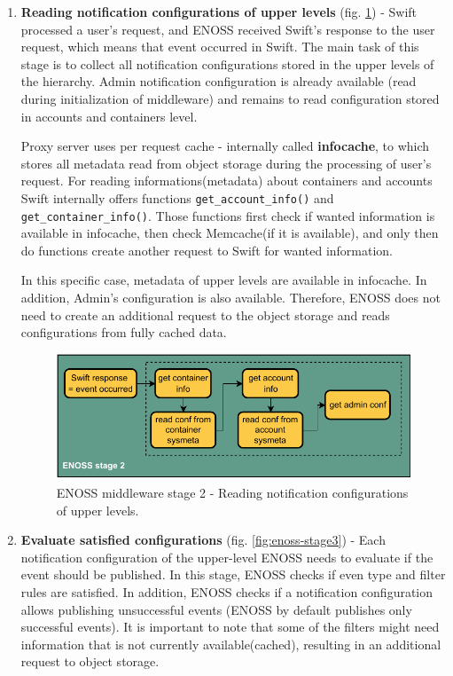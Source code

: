 \begin{enumerate}
        \item \textbf{Reading notification configurations of upper levels} (fig. \ref{fig:enoss-stage2}) - Swift processed a user's request, and ENOSS received Swift's response to the user request, which means that event occurred in Swift. The main task of this stage is to collect all notification configurations stored in the upper levels of the hierarchy. Admin notification configuration is already available (read during initialization of middleware) and remains to read configuration stored in accounts and containers level.

        Proxy server uses per request cache - internally called \textbf{infocache}, to which stores all metadata read from object storage during the processing of user's request. For reading informations(metadata) about containers and accounts Swift internally offers functions \texttt{get\_account\_info()} and \texttt{get\_container\_info()}. Those functions first check if wanted information is available in infocache, then check Memcache(if it is available), and only then do functions create another request to Swift for wanted information.

        In this specific case, metadata of upper levels are available in infocache. In addition, Admin's configuration is also available. Therefore, ENOSS does not need to create an additional request to the object storage and reads configurations from fully cached data.

        \begin{figure}[H]
            \centering
            \includegraphics[width=1\textwidth]{obrazky-figures/enoss-stage2.pdf}
            \caption{ENOSS middleware stage 2 - Reading notification configurations of upper levels.}
            \label{fig:enoss-stage2}
        \end{figure}

        \item \textbf{Evaluate satisfied configurations} (fig. \ref{fig:enoss-stage3}) - Each notification configuration of the upper-level ENOSS needs to evaluate if the event should be published. In this stage, ENOSS checks if even type and filter rules are satisfied. In addition, ENOSS checks if a notification configuration allows publishing unsuccessful events (ENOSS by default publishes only successful events). It is important to note that some of the filters might need information that is not currently available(cached), resulting in an additional request to object storage.


\end{enumerate}
